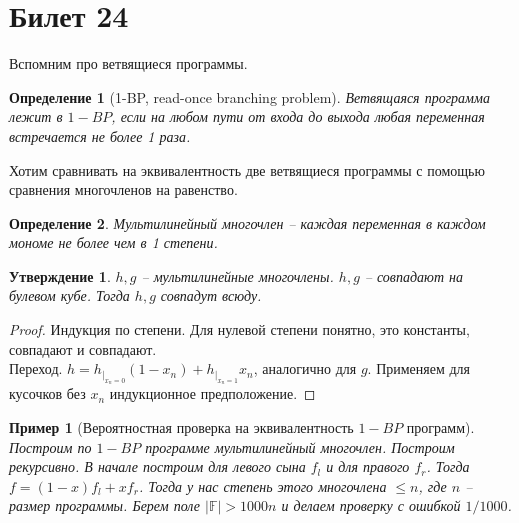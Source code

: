 \documentclass[12pt, letterpaper]{article}
\newtheorem{prop}{Утверждение}[section]
\newtheorem{defi}{Определение}[section]
\newtheorem{sample}{Пример}[section]
\newcommand{\Ff}{\mathbb{F}}
\begin{document}
\section{Билет 24}
Вспомним про ветвящиеся программы.
\begin{defi}[1-BP, read-once branching problem]
Ветвящаяся программа лежит в $1-BP$, если на любом пути от входа до выхода любая переменная встречается не более 1 раза.
\end{defi}
Хотим сравнивать на эквивалентность две ветвящиеся программы с помощью сравнения многочленов на равенство.\\
\begin{defi}
Мультилинейный многочлен -- каждая переменная в каждом мономе не более чем в 1 степени.
\end{defi}
\begin{prop}
$h,g$ -- мультилинейные многочлены. $h,g$ -- совпадают на булевом кубе. Тогда $h,g$ совпадут всюду. 
\end{prop}
\begin{proof}
Индукция по степени. Для нулевой степени понятно, это константы, совпадают и совпадают.\\
Переход. $h=h_{|_{x_n=0}} (1-x_n) + h_{|_{x_n=1}} x_n$, аналогично для $g$. Применяем для кусочков без $x_n$ индукционное предположение. 
\end{proof}
\begin{sample}[Вероятностная проверка на эквивалентность $1-BP$ программ]
Построим по $1-BP$ программе мультилинейный многочлен. Построим рекурсивно. В начале построим для левого сына $f_l$ и для правого $f_r$. Тогда $f=(1-x)f_l + x f_r$. Тогда у нас степень этого многочлена $\leq n$, где $n$ -- размер программы. Берем поле $|\Ff| > 1000n$ и делаем проверку с ошибкой $1/1000$.
\end{sample}
\end{document}

